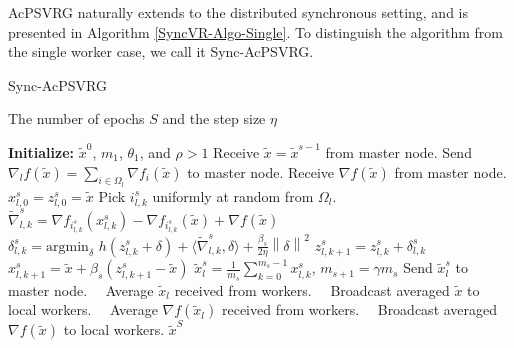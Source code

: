 \documentclass[letterpaper]{article} %
\newcommand{\norm}[1]{\left\lVert#1\right\rVert}
\renewcommand{\algorithmicrequire}{
\textbf{Input:}}
\renewcommand{\algorithmicensure}{\textbf{Output:}}
\begin{document}
AcPSVRG naturally extends to the distributed synchronous
setting,  and  is  presented  in  Algorithm  \ref{SyncVR-Algo-Single}.  To  distinguish  the
algorithm from the single worker case, we call it Sync-AcPSVRG. 
\begin{algorithm}[H]
\caption{Sync-AcPSVRG}\label{SyncVR-Algo-Single}
\begin{algorithmic}
\renewcommand{\algorithmicrequire}{\textbf{Input:}}
 \renewcommand{\algorithmicensure}{\textbf{Output:}}
  \newcommand{\INITIALIZE}{\item[\textbf{Initialize:}]}
\REQUIRE The number of epochs $S$ and the step size $\eta$
\INITIALIZE $\widetilde{x}^0$, $m_1$, $\theta_1$, and $\rho > 1$
\STATE Receive $\widetilde{x} = \widetilde{x}^{s-1}$ from master node.
\STATE  Send $\nabla_l f(\widetilde{x}) = \sum_{i\in\Omega_l}\nabla f_i(\widetilde{x})$ to master node.
\STATE  Receive $\nabla f(\widetilde{x})$ from master node.
 \STATE $x_{l,0}^s = z_{l,0}^s = \widetilde{x}$
 \STATE Pick $i_{l,k}^s$ uniformly at random from $\Omega_l$.
 \STATE $\widetilde{\nabla}_{l,k}^s = \nabla f_{i_{l,k}^s}(x_{l,k}^s) - \nabla f_{i_{l,k}^s}(\widetilde{x}) + \nabla f(\widetilde{x})$
 \STATE $\delta_{l,k}^s = \text{argmin}_{\delta}\,\,h(z_{l,k}^s+\delta)+\langle\widetilde{\nabla}_{l,k}^s,\delta\rangle + \frac{{\beta_s}}{2\eta}\norm{\delta}^2$
 \STATE $z_{l,k+1}^s = z_{l,k}^s + \delta_{l,k}^s$
 \STATE $x_{l,k+1}^s = \widetilde{x}+\beta_s(z_{l,k+1}^s-\widetilde{x})$
 \ENDFOR
\STATE $\widetilde{x}_{l}^s = \frac{1}{m_s}\sum_{k=0}^{m_s-1} x_{l,k}^s$, $m_{s+1} = \gamma m_s$
\STATE Send $\widetilde{x}_{l}^s$ to master node.
 \ENDFOR
 \ENDFOR
 \STATE\qquad\,\,\,\, Average $\widetilde{x}_l$ received from workers.
  \STATE\qquad\,\,\,\, Broadcast averaged $\widetilde{x}$ to local workers.
  \STATE\qquad\,\,\,\, Average $\nabla f(\widetilde{x}_l)$ received from workers.
  \STATE\qquad\,\,\,\, Broadcast averaged $\nabla f(\widetilde{x})$ to local workers.
 \ENSURE $\widetilde{x}^S$
\end{algorithmic}
\end{algorithm}
\end{document}

